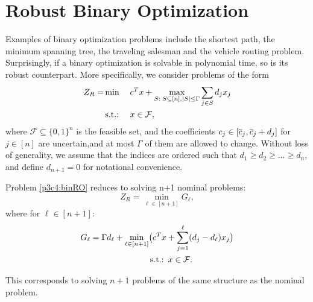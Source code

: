 \section{Robust Binary Optimization}

Examples of binary optimization problems include the shortest path, the minimum spanning tree, the traveling salesman and the vehicle routing problem. Surprisingly, if a binary optimization is solvable in polynomial time, so is its robust counterpart. More specifically, we consider problems of the form
\begin{align}\label{p3c4:binRO}
Z_R = & \min  && c^Tx + \max\limits_{S:\;S\subseteq[n],\vert S\vert\leq\Gamma} \sum\limits_{j\in S}d_jx_j \\
& \mathop{\text{s.t.:~}} && x\in\mathcal{F},
\end{align}
where $\mathcal{F}\subseteq \{0,1\}^n$ is the feasible set, and the coefficients $c_j\in[\overline{ c }_j,\overline{ c }_j+d_j]$ for $j\in[n]$ are uncertain,and at most $\Gamma$ of them are allowed to change. Without loss of generality, we assume that the indices are ordered such that $d_1\geq d_2\geq \dots\geq d_n$, and define $d_{n+1} = 0$ for notational convenience.

\begin{theorem}
Problem \eqref{p3c4:binRO} reduces to solving n+1 nominal problems:
\[Z_R = \min\limits_{\ell\in [n+1]} G_\ell ,\]
where for $\ell \in [n+1]$:
\begin{align}\label{p3c4:G_l}
G_\ell = \Gamma d_\ell +\min\limits_{\ell\in [n+1]} & \big( c^Tx+\sum\limits_{j=1}^\ell (d_j-d_\ell)x_j\big) \\
& \mathop{\text{s.t.:~}} x\in\mathcal{F}.
\end{align}
\end{theorem}
This corresponds to solving $n+1$ problems of the same structure as the nominal problem.

